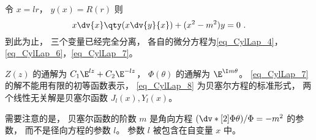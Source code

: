 令 $x = lr$，   $y(x) = R(r)$ 则
\begin{equation}\label{eq_CylLap_8} 
x \dv{x} \qty(x\dv{y}{x}) + (x^2 - m^2)y = 0~.
\end{equation}
到此为止， 三个变量已经完全分离， 各自的微分方程为\autoref{eq_CylLap_4}， \autoref{eq_CylLap_6}，\autoref{eq_CylLap_7}。

$Z(z)$ 的通解为 $C_1\E^{lz} + C_2 \E^{-lz}$，   $\Phi(\theta)$ 的通解为 $\E^{\I m\theta}$。   \autoref{eq_CylLap_7} 的解不能用有限的初等函数表示， \autoref{eq_CylLap_8} 为贝塞尔方程的标准形式， 两个线性无关解是贝塞尔函数 $J_l(x), Y_l(x)$。

需要注意的是， 贝塞尔函数的阶数 $m$ 是角向方程 $(\dv*[2]{\Phi}{\theta})/\Phi = -m^2$ 的参数， 而不是径向方程的参数 $l$。 参数 $l$ 被包含在自变量 $x$ 中。
